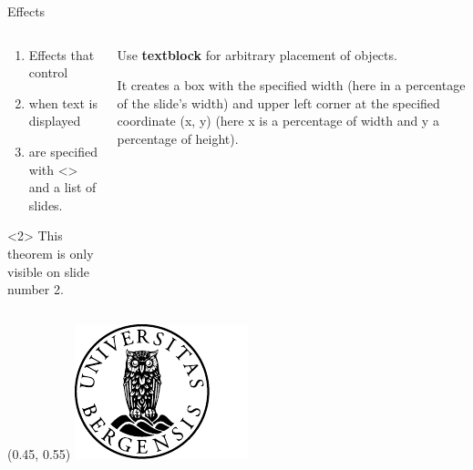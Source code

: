 \documentclass[UKenglish]{beamer}
\begin{document}
\begin{frame}{Effects}
    \begin{columns}[onlytextwidth]
        \begin{column}{0.49\textwidth}
            \begin{enumerate}[<+-|alert@+>]
                \item
                Effects that control

                \item
                when text is displayed

                \item
                are specified with <> and a list of slides.
            \end{enumerate}

            \begin{theorem}<2>
                This theorem is only visible on slide number 2.
            \end{theorem}
        \end{column}
        \begin{column}{0.49\textwidth}
            Use \textbf<2->{textblock} for arbitrary placement of objects.

            \pause
            \medskip

            It creates a box
            with the specified width (here in a percentage of the slide's width)
            and upper left corner at the specified coordinate (x, y)
            (here x is a percentage of width and y a percentage of height).
        \end{column}
    \end{columns}
    
    {
        \begin{textblock}{0.3}(0.45, 0.55)
            \includegraphics[width = \textwidth]{UiB-images/UiB-emblem}
        \end{textblock}
    }
\end{frame}
\end{document}
